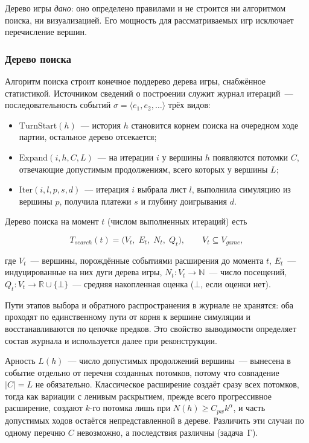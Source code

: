 Дерево игры \emph{дано}: оно определено правилами и не строится ни
алгоритмом поиска, ни визуализацией. Его мощность для рассматриваемых игр
исключает перечисление вершин.

\subsubsection{Дерево поиска}

Алгоритм поиска строит конечное поддерево дерева игры, снабжённое
статистикой. Источником сведений о построении служит журнал итераций~---
последовательность событий $\sigma = \langle e_1, e_2, \dots \rangle$ трёх
видов:

\begin{itemize}
  \item $\mathrm{TurnStart}(h)$~--- история $h$ становится корнем поиска на
очередном ходе партии, остальное дерево отсекается;
  \item $\mathrm{Expand}(i, h, C, L)$~--- на итерации $i$ у вершины $h$
появляются потомки $C$, отвечающие допустимым продолжениям, всего которых
у вершины $L$;
  \item $\mathrm{Iter}(i, l, p, s, d)$~--- итерация $i$ выбрала лист $l$,
выполнила симуляцию из вершины $p$, получила платежи $s$ и глубину
доигрывания $d$.
\end{itemize}

Дерево поиска на момент $t$ (числом выполненных итераций) есть

\begin{equation}
T_{search}(t) = \bigl( V_t,\; E_t,\; N_t,\; Q_t \bigr), \qquad
V_t \subseteq V_{game},
\end{equation}

где $V_t$~--- вершины, порождённые событиями расширения до момента $t$,
$E_t$~--- индуцированные на них дуги дерева игры, $N_t\colon V_t \to
\mathbb{N}$~--- число посещений, $Q_t\colon V_t \to \mathbb{R} \cup
\{\bot\}$~--- средняя накопленная оценка ($\bot$, если оценки нет).

Пути этапов выбора и обратного распространения в журнале не хранятся: оба
проходят по единственному пути от корня к вершине симуляции и
восстанавливаются по цепочке предков. Это свойство выводимости определяет
состав журнала и используется далее при реконструкции.

Арность $L(h)$~--- число допустимых продолжений вершины~--- вынесена в
событие отдельно от перечня созданных потомков, потому что совпадение
$|C| = L$ не обязательно. Классическое расширение создаёт сразу всех
потомков, тогда как вариации с ленивым раскрытием, прежде всего
прогрессивное расширение, создают $k$-го потомка лишь при $N(h) \ge C_{pw}
k^{\alpha}$, и часть допустимых ходов остаётся непредставленной в дереве.
Различить эти случаи по одному перечню $C$ невозможно, а последствия
различны (задача~Г).

